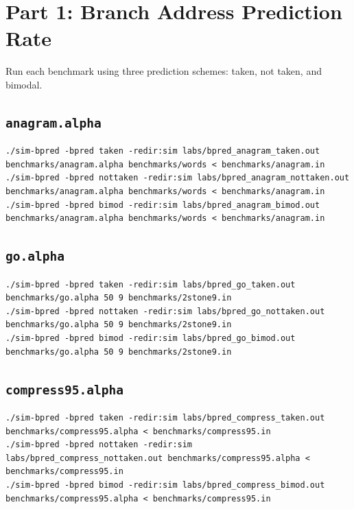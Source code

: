\documentclass[11pt]{article}
\begin{document}
\section{Part 1: Branch Address Prediction Rate}
Run each benchmark using three prediction schemes: taken, not taken, and bimodal.
\subsection{\texttt{anagram.alpha}}
\begin{lstlisting}
./sim-bpred -bpred taken -redir:sim labs/bpred_anagram_taken.out benchmarks/anagram.alpha benchmarks/words < benchmarks/anagram.in
./sim-bpred -bpred nottaken -redir:sim labs/bpred_anagram_nottaken.out benchmarks/anagram.alpha benchmarks/words < benchmarks/anagram.in
./sim-bpred -bpred bimod -redir:sim labs/bpred_anagram_bimod.out benchmarks/anagram.alpha benchmarks/words < benchmarks/anagram.in
\end{lstlisting}
\subsection{\texttt{go.alpha}}
\begin{lstlisting}
./sim-bpred -bpred taken -redir:sim labs/bpred_go_taken.out benchmarks/go.alpha 50 9 benchmarks/2stone9.in
./sim-bpred -bpred nottaken -redir:sim labs/bpred_go_nottaken.out benchmarks/go.alpha 50 9 benchmarks/2stone9.in
./sim-bpred -bpred bimod -redir:sim labs/bpred_go_bimod.out benchmarks/go.alpha 50 9 benchmarks/2stone9.in
\end{lstlisting}
\subsection{\texttt{compress95.alpha}}
\begin{lstlisting}
./sim-bpred -bpred taken -redir:sim labs/bpred_compress_taken.out benchmarks/compress95.alpha < benchmarks/compress95.in
./sim-bpred -bpred nottaken -redir:sim labs/bpred_compress_nottaken.out benchmarks/compress95.alpha < benchmarks/compress95.in
./sim-bpred -bpred bimod -redir:sim labs/bpred_compress_bimod.out benchmarks/compress95.alpha < benchmarks/compress95.in
\end{lstlisting}
\end{document}
